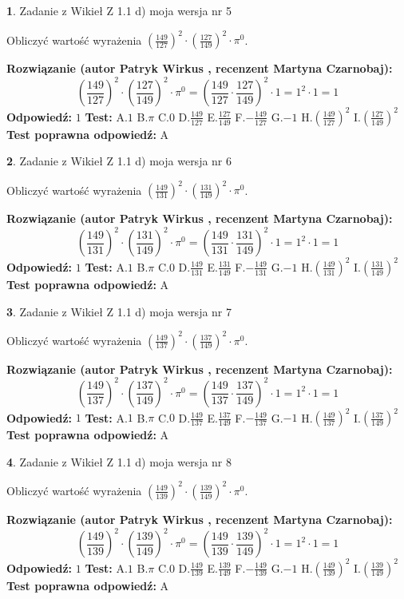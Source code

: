 \documentclass[12pt, a4paper]{article}
\theoremstyle{definition} %
\newtheorem{zad}{}
\newcommand{\zadStart}[1]{\begin{zad}#1\newline}
\newcommand{\zadStop}{\end{zad}}
\newcommand{\rozwStart}[2]{\noindent \textbf{Rozwiązanie (autor #1 , recenzent #2): }\newline}
\newcommand{\rozwStop}{\newline}
\newcommand{\odpStart}{\noindent \textbf{Odpowiedź:}\newline}
\newcommand{\odpStop}{\newline}
\newcommand{\testStart}{\noindent \textbf{Test:}\newline}
\newcommand{\testStop}{\newline}
\newcommand{\kluczStart}{\noindent \textbf{Test poprawna odpowiedź:}\newline}
\newcommand{\kluczStop}{\newline}
\begin{document}
\zadStart{Zadanie z Wikieł Z 1.1 d) moja wersja nr 5}

Obliczyć wartość wyrażenia $(\frac{149}{127})^{2} \cdot (\frac{127}{149})^{2} \cdot \pi^{0}$.
\zadStop
\rozwStart{Patryk Wirkus}{Martyna Czarnobaj}
$$(\frac{149}{127})^{2} \cdot (\frac{127}{149})^{2} \cdot \pi^{0} = (\frac{149}{127} \cdot \frac{127}{149})^{2} \cdot 1 = 1^{2} \cdot 1 = 1$$
\rozwStop
\odpStart
$1$
\odpStop
\testStart
A.$1$ B.$\pi$ C.$0$ D.$\frac{149}{127}$ E.$\frac{127}{149}$
F.$-\frac{149}{127}$ G.$-1$
H.$(\frac{149}{127})^{2}$
I.$(\frac{127}{149})^{2}$
\testStop
\kluczStart
A
\kluczStop



\zadStart{Zadanie z Wikieł Z 1.1 d) moja wersja nr 6}

Obliczyć wartość wyrażenia $(\frac{149}{131})^{2} \cdot (\frac{131}{149})^{2} \cdot \pi^{0}$.
\zadStop
\rozwStart{Patryk Wirkus}{Martyna Czarnobaj}
$$(\frac{149}{131})^{2} \cdot (\frac{131}{149})^{2} \cdot \pi^{0} = (\frac{149}{131} \cdot \frac{131}{149})^{2} \cdot 1 = 1^{2} \cdot 1 = 1$$
\rozwStop
\odpStart
$1$
\odpStop
\testStart
A.$1$ B.$\pi$ C.$0$ D.$\frac{149}{131}$ E.$\frac{131}{149}$
F.$-\frac{149}{131}$ G.$-1$
H.$(\frac{149}{131})^{2}$
I.$(\frac{131}{149})^{2}$
\testStop
\kluczStart
A
\kluczStop



\zadStart{Zadanie z Wikieł Z 1.1 d) moja wersja nr 7}

Obliczyć wartość wyrażenia $(\frac{149}{137})^{2} \cdot (\frac{137}{149})^{2} \cdot \pi^{0}$.
\zadStop
\rozwStart{Patryk Wirkus}{Martyna Czarnobaj}
$$(\frac{149}{137})^{2} \cdot (\frac{137}{149})^{2} \cdot \pi^{0} = (\frac{149}{137} \cdot \frac{137}{149})^{2} \cdot 1 = 1^{2} \cdot 1 = 1$$
\rozwStop
\odpStart
$1$
\odpStop
\testStart
A.$1$ B.$\pi$ C.$0$ D.$\frac{149}{137}$ E.$\frac{137}{149}$
F.$-\frac{149}{137}$ G.$-1$
H.$(\frac{149}{137})^{2}$
I.$(\frac{137}{149})^{2}$
\testStop
\kluczStart
A
\kluczStop



\zadStart{Zadanie z Wikieł Z 1.1 d) moja wersja nr 8}

Obliczyć wartość wyrażenia $(\frac{149}{139})^{2} \cdot (\frac{139}{149})^{2} \cdot \pi^{0}$.
\zadStop
\rozwStart{Patryk Wirkus}{Martyna Czarnobaj}
$$(\frac{149}{139})^{2} \cdot (\frac{139}{149})^{2} \cdot \pi^{0} = (\frac{149}{139} \cdot \frac{139}{149})^{2} \cdot 1 = 1^{2} \cdot 1 = 1$$
\rozwStop
\odpStart
$1$
\odpStop
\testStart
A.$1$ B.$\pi$ C.$0$ D.$\frac{149}{139}$ E.$\frac{139}{149}$
F.$-\frac{149}{139}$ G.$-1$
H.$(\frac{149}{139})^{2}$
I.$(\frac{139}{149})^{2}$
\testStop
\kluczStart
A
\kluczStop
\end{document}
